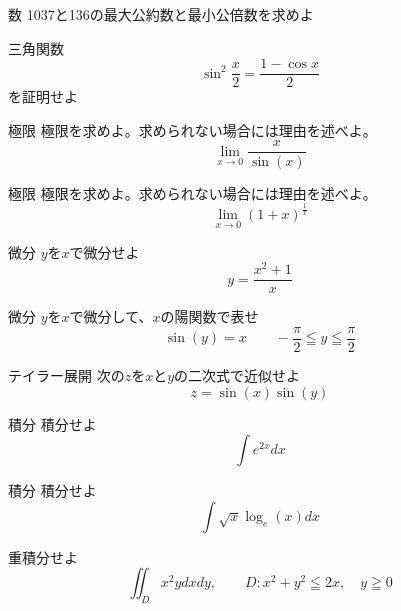 \begin{slide}{数}
1037と136の最大公約数と最小公倍数を求めよ
\end{slide}
\begin{slide}{三角関数}
\begin{equation}
\sin^2\frac{x}{2} = \frac{1-\cos{x}}{2}
\end{equation}
を証明せよ
\end{slide}
\begin{slide}{極限}
極限を求めよ。求められない場合には理由を述べよ。
\begin{equation}
\lim_{x\to 0}\frac{x}{\sin(x)}
\end{equation}
\end{slide}
\begin{slide}{極限}
極限を求めよ。求められない場合には理由を述べよ。
\begin{equation}
\lim_{x\to 0} \left(1 + x\right)^\frac{1}{x}
\end{equation}
\end{slide}
\begin{slide}{微分}
$y$を$x$で微分せよ
\begin{equation}
y = \frac{x^2 +1}{x}
\end{equation}
\end{slide}
\begin{slide}{微分}
$y$を$x$で微分して、$x$の陽関数で表せ
\begin{equation}
\sin(y) = x \qquad -\frac{\pi}{2} \leqq y \leqq \frac{\pi}{2}
\end{equation}
\end{slide}
\begin{slide}{テイラー展開}
次の$z$を$x$と$y$の二次式で近似せよ
\begin{equation}
z = \sin(x)\sin(y)
\end{equation}
\end{slide}
\begin{slide}{積分}
積分せよ
\begin{equation}
\int e^{2x} dx
\end{equation}
\end{slide}
\begin{slide}{積分}
積分せよ
\begin{equation}
\int \sqrt{x}\log_e (x) dx
\end{equation}
\end{slide}

\begin{slide}{重積分せよ}
\begin{equation}
\iint_D x^2y dx dy, \qquad  D: x^2+ y^2 \leqq 2x, \quad y \geqq 0  \nonumber
\end{equation}
\end{slide}

